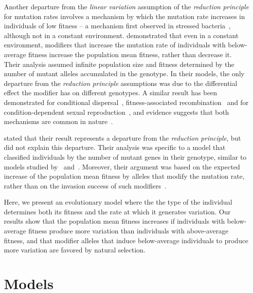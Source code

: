 \documentclass[9pt, a4paper, twocolumn]{extarticle}
\begin{document}
Another departure from the \emph{linear variation} assumption of the \emph{reduction principle} for mutation rates involves a mechanism by which the mutation rate increases in individuals of low fitness -- a mechanism first observed in stressed bacteria~\citep{Foster2007}, although not in a constant environment.
\citet{Ram2012} demonstrated that even in a constant environment, modifiers that increase the mutation rate of individuals with below-average fitness increase the population mean fitness, rather than decrease it.
Their analysis assumed  infinite population size and fitness  determined by the number of mutant alleles accumulated in the genotype.
In their models, the only departure from the \emph{reduction principle} assumptions was due to the differential effect the modifier has on different genotypes.
A similar result has been demonstrated for conditional dispersal~\citep[Th.~39]{Altenberg2012b}, fitness-associated recombination~\citep{Hadany2003a} and for condition-dependent sexual reproduction~\citep{Hadany2007a}, and evidence suggests that both mechanisms are common in nature~\citep{Ram2016}.

\citet{Ram2012} stated that their result represents a departure from the \emph{reduction principle}, but did not explain this departure.
Their analysis was specific to a model that classified individuals by the number of mutant genes in their genotype, similar to models studied by~\citet{Kimura1966a} and~\citet{Haigh1978}.
Moreover, their argument was based on the expected increase of the population mean fitness by alleles that modify the mutation rate, rather than on the invasion success of such modifiers~\citep[i.e., analysis of \emph{evolutionary genetic stability}, see][]{Eshel1982, Lessard1990}.

Here, we present an evolutionary model where the the type of the individual determines both its fitness and the rate at which it generates variation.
Our results show that the population mean fitness increases if individuals with below-average fitness produce more variation than individuals with above-average fitness,
and that modifier alleles that induce below-average individuals to produce more variation are favored by natural selection.

\section*{Models}\label{sec:models}
\end{document}
